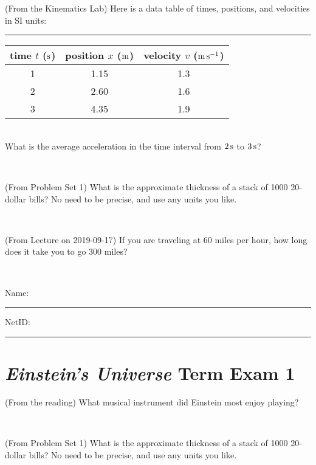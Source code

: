 \documentclass[12pt, letterpaper]{article}
\begin{document}
\begin{problem} (From the Kinematics Lab)
Here is a data table of times, positions, and velocities in SI units:\\
\rule{1.0in}{0pt}\begin{tabular}{c|c|c}
time $t$ ($\mathrm{s}$) & position $x$ ($\mathrm{m}$) & velocity $v$ ($\mathrm{m}\,\mathrm{s}^{-1}$) \\
\hline
1 & 1.15 & 1.3 \\
2 & 2.60 & 1.6 \\
3 & 4.35 & 1.9 \\
\hline
\end{tabular}\\
What is the average acceleration in the time interval from $2\,\mathrm{s}$ to $3\,\mathrm{s}$?
\end{problem}


\vfill ~

\begin{problem} (From Problem Set 1)
What is the approximate thickness of a stack of 1000 20-dollar bills?
No need to be precise, and use any units you like.
\end{problem}


\vfill ~

\begin{problem} (From Lecture on 2019-09-17)
If you are traveling at 60 miles per hour, how long does
it take you to go 300 miles?
\end{problem}


\vfill ~


\cleardoublepage



\noindent
Name: \rule[-1ex]{0.60\textwidth}{0.1pt}
NetID: \rule[-1ex]{0.20\textwidth}{0.1pt}

\section*{\textsl{Einstein's Universe} Term Exam 1}
\setcounter{problem}{1}


\begin{problem} (From the reading)
What musical instrument did Einstein most enjoy playing?
\end{problem}


\vfill ~

\begin{problem} (From Problem Set 1)
What is the approximate thickness of a stack of 1000 20-dollar bills?
No need to be precise, and use any units you like.
\end{problem}
\end{document}
